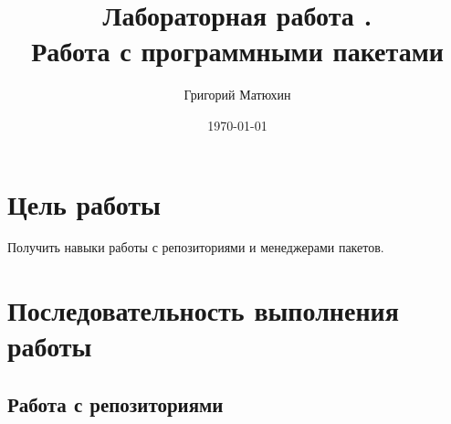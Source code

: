 \documentclass[12pt]{article}
\author{Григорий Матюхин}
\date{\today}
\title{Лабораторная работа \textnumero4.\\Работа с программными пакетами}
\begin{document}
\maketitle
\newpage
\tableofcontents
\newpage
\section{Цель работы}
Получить навыки работы с репозиториями и менеджерами пакетов.

\section{Последовательность выполнения работы}

\subsection{Работа с репозиториями}
\end{document}
